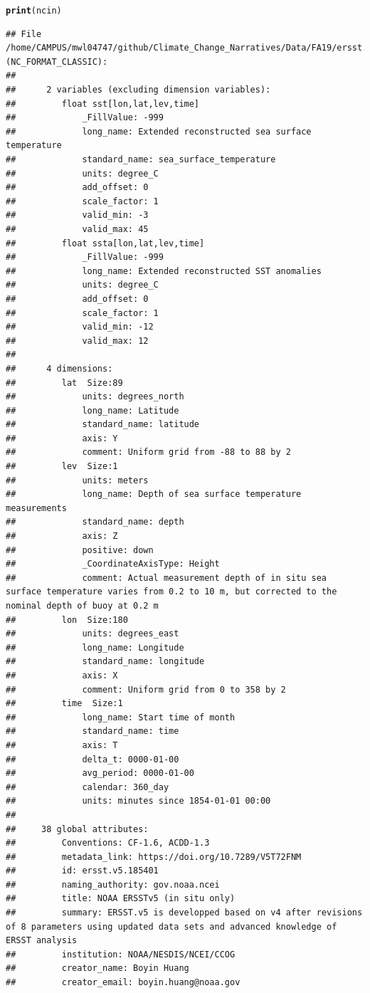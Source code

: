 \documentclass{article}\usepackage[]{graphicx}\usepackage[]{color}
\makeatletter
\newcommand{\hlstd}[1]{\textcolor[rgb]{0.345,0.345,0.345}{#1}}%
\newcommand{\hlkwd}[1]{\textcolor[rgb]{0.737,0.353,0.396}{\textbf{#1}}}%
\newenvironment{kframe}{%
 \def\at@end@of@kframe{}%
 \ifinner\ifhmode%
  \def\at@end@of@kframe{\end{minipage}}%
  \begin{minipage}{\columnwidth}%
 \fi\fi%
 \def\FrameCommand##1{\hskip\@totalleftmargin \hskip-\fboxsep
 \colorbox{shadecolor}{##1}\hskip-\fboxsep
     \hskip-\linewidth \hskip-\@totalleftmargin \hskip\columnwidth}%
 \MakeFramed {\advance\hsize-\width
   \@totalleftmargin\z@ \linewidth\hsize
   \@setminipage}}%
 {\par\unskip\endMakeFramed%
 \at@end@of@kframe}
\newenvironment{knitrout}{}{} %
\makeatother
\begin{document}
\begin{knitrout}
\begin{kframe}
\begin{alltt}
\hlkwd{print}\hlstd{(ncin)}
\end{alltt}
\begin{verbatim}
## File /home/CAMPUS/mwl04747/github/Climate_Change_Narratives/Data/FA19/ersst.v5.185401.nc (NC_FORMAT_CLASSIC):
## 
##      2 variables (excluding dimension variables):
##         float sst[lon,lat,lev,time]   
##             _FillValue: -999
##             long_name: Extended reconstructed sea surface temperature
##             standard_name: sea_surface_temperature
##             units: degree_C
##             add_offset: 0
##             scale_factor: 1
##             valid_min: -3
##             valid_max: 45
##         float ssta[lon,lat,lev,time]   
##             _FillValue: -999
##             long_name: Extended reconstructed SST anomalies
##             units: degree_C
##             add_offset: 0
##             scale_factor: 1
##             valid_min: -12
##             valid_max: 12
## 
##      4 dimensions:
##         lat  Size:89
##             units: degrees_north
##             long_name: Latitude
##             standard_name: latitude
##             axis: Y
##             comment: Uniform grid from -88 to 88 by 2
##         lev  Size:1
##             units: meters
##             long_name: Depth of sea surface temperature measurements
##             standard_name: depth
##             axis: Z
##             positive: down
##             _CoordinateAxisType: Height
##             comment: Actual measurement depth of in situ sea surface temperature varies from 0.2 to 10 m, but corrected to the nominal depth of buoy at 0.2 m
##         lon  Size:180
##             units: degrees_east
##             long_name: Longitude
##             standard_name: longitude
##             axis: X
##             comment: Uniform grid from 0 to 358 by 2
##         time  Size:1
##             long_name: Start time of month
##             standard_name: time
##             axis: T
##             delta_t: 0000-01-00
##             avg_period: 0000-01-00
##             calendar: 360_day
##             units: minutes since 1854-01-01 00:00
## 
##     38 global attributes:
##         Conventions: CF-1.6, ACDD-1.3
##         metadata_link: https://doi.org/10.7289/V5T72FNM
##         id: ersst.v5.185401
##         naming_authority: gov.noaa.ncei
##         title: NOAA ERSSTv5 (in situ only)
##         summary: ERSST.v5 is developped based on v4 after revisions of 8 parameters using updated data sets and advanced knowledge of ERSST analysis
##         institution: NOAA/NESDIS/NCEI/CCOG
##         creator_name: Boyin Huang
##         creator_email: boyin.huang@noaa.gov

\end{verbatim}
\end{kframe}
\end{knitrout}
\end{document}
